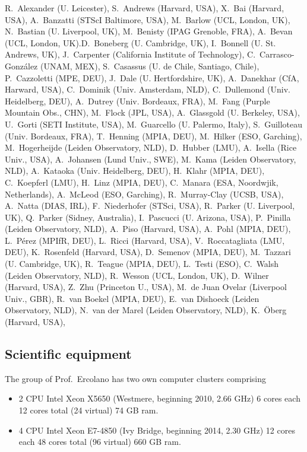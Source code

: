 \documentclass[10pt,fleqn,twoside]{article}
\begin{document}
R.~Alexander (U. Leicester),
S.~Andrews (Harvard, USA),
X.~Bai (Harvard, USA),
A.~Banzatti (STScI Baltimore, USA),
M.~Barlow (UCL, London, UK),
N.~Bastian (U. Liverpool, UK),
M.~Benisty (IPAG Grenoble, FRA),
A.~Bevan (UCL, London, UK).D.~Boneberg (U. Cambridge, UK),
I.~Bonnell (U. St. Andrews, UK),
J.~Carpenter (California Institute of Technology),
C.~Carrasco-González (UNAM, MEX),
S.~Casassus (U. de Chile, Santiago, Chile),
P.~Cazzoletti (MPE, DEU),
J.~Dale (U. Hertfordshire, UK),
A.~Danekhar (CfA, Harward, USA),
C.~Dominik (Univ. Amsterdam, NLD),
C.~Dullemond (Univ. Heidelberg, DEU),
A.~Dutrey (Univ. Bordeaux, FRA),
M.~Fang (Purple Mountain Obs., CHN),
M.~Flock (JPL, USA),
A.~Glassgold (U. Berkeley, USA),
U.~Gorti (SETI Institute, USA),
M.~Guarcello (U. Palermo, Italy),
S.~Guilloteau (Univ. Bordeaux, FRA),
T.~Henning (MPIA, DEU),
M.~Hilker (ESO, Garching),
M.~Hogerheijde (Leiden Observatory, NLD),
D.~Hubber (LMU),
A.~Isella (Rice Univ., USA),
A.~Johansen (Lund Univ., SWE),
M.~Kama (Leiden Observatory, NLD),
A.~Kataoka (Univ. Heidelberg, DEU),
H.~Klahr (MPIA, DEU),
C.~Koepferl (LMU),
H.~Linz (MPIA, DEU),
C.~Manara (ESA, Noordwjik, Netherlands),
A.~McLeod (ESO, Garching),
R.~Murray-Clay (UCSB, USA),
A.~Natta (DIAS, IRL),
F.~Niederhofer (STSci, USA),
R.~Parker (U. Liverpool, UK),
Q.~Parker (Sidney, Australia),
I.~Pascucci (U. Arizona, USA),
P.~Pinilla (Leiden Observatory, NLD),
A.~Piso (Harvard, USA),
A.~Pohl (MPIA, DEU),
L.~Pérez (MPIfR, DEU),
L.~Ricci (Harvard, USA),
V.~Roccatagliata (LMU, DEU),
K.~Rosenfeld (Harvard, USA),
D.~Semenov (MPIA, DEU),
M.~Tazzari (U. Cambridge, UK),
R.~Teague (MPIA, DEU),
L.~Testi (ESO),
C.~Walsh (Leiden Observatory, NLD),
R.~Wesson (UCL, London, UK),
D.~Wilner (Harvard, USA),
Z.~Zhu (Princeton U., USA),
M.~de Juan Ovelar (Liverpool Univ., GBR),
R.~van Boekel (MPIA, DEU),
E.~van Dishoeck (Leiden Observatory, NLD),
N.~van der Marel (Leiden Observatory, NLD),
K.~Öberg (Harvard, USA),


\subsection{Scientific equipment}

The group of Prof.\ Ercolano has two own computer clusters comprising 

\begin{itemize}
\item 2 CPU Intel Xeon X5650 (Westmere, beginning
2010, 2.66 GHz) 6 cores each 12 cores total (24 virtual) 74 GB ram.

\item 4 CPU Intel Xeon E7-4850 (Ivy Bridge, beginning 2014, 2.30 GHz)
12 cores each 48 cores total (96 virtual) 660 GB ram.

\end{itemize}
\end{document}
